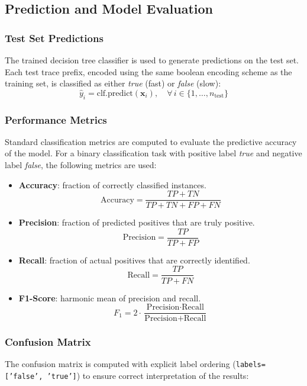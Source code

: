 \documentclass{article}
\begin{document}
\subsection{Prediction and Model Evaluation}

\subsubsection{Test Set Predictions}

The trained decision tree classifier is used to generate predictions on the test set. Each test trace prefix, encoded using the same boolean encoding scheme as the training set, is classified as either \textit{true} (fast) or \textit{false} (slow):
\[
\hat{y}_i = \text{clf.predict}(\mathbf{x}_i), \quad \forall \, i \in \{1, \dots, n_{\text{test}}\}
\]

\subsubsection{Performance Metrics}

Standard classification metrics are computed to evaluate the predictive accuracy of the model. For a binary classification task with positive label \textit{true} and negative label \textit{false}, the following metrics are used:

\begin{itemize}
    \item \textbf{Accuracy}: fraction of correctly classified instances.
    \[
    \text{Accuracy} = \frac{TP + TN}{TP + TN + FP + FN}
    \]
    \item \textbf{Precision}: fraction of predicted positives that are truly positive.
    \[
    \text{Precision} = \frac{TP}{TP + FP}
    \]
    \item \textbf{Recall}: fraction of actual positives that are correctly identified.
    \[
    \text{Recall} = \frac{TP}{TP + FN}
    \]
    \item \textbf{F1-Score}: harmonic mean of precision and recall.
    \[
    F_1 = 2 \cdot \frac{\text{Precision} \cdot \text{Recall}}{\text{Precision} + \text{Recall}}
    \]
\end{itemize}

\subsubsection{Confusion Matrix}

The confusion matrix is computed with explicit label ordering (\texttt{labels=['false', 'true']}) to ensure correct interpretation of the results:
\end{document}
